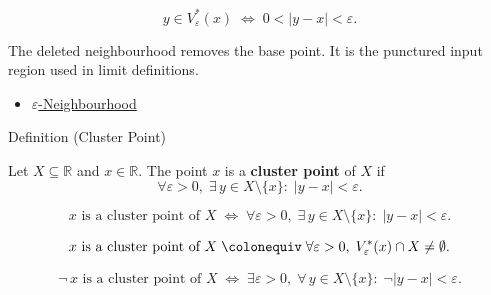 \begin{remark*}
\[
  y\in V_\varepsilon^*(x)\;\Longleftrightarrow\;0<|y-x|<\varepsilon.
\]
\end{remark*}

\begin{remark*}[Interpretation]
The deleted neighbourhood removes the base point. It is the punctured
input region used in limit definitions.
\end{remark*}

\begin{dependencies}
\begin{itemize}
  \item \hyperref[def:epsilon-neighbourhood]{$\varepsilon$-Neighbourhood}
\end{itemize}
\end{dependencies}


\begin{definitionbox}{Definition (Cluster Point)}
\begin{definition}
\label{def:cluster-point-r}
Let $X \subseteq \mathbb{R}$ and $x \in \mathbb{R}$. The point $x$
is a \textbf{cluster point} of $X$ if
\[
  \forall\varepsilon > 0,\;
  \exists\, y \in X \setminus \{x\} :\;
  |y-x|<\varepsilon.
\]
\end{definition}
\end{definitionbox}

\begin{remark*}
\[
  x\text{ is a cluster point of }X
  \;\iff\;
  \forall\varepsilon > 0,\;
  \exists\, y \in X \setminus \{x\} :\;
  |y - x| < \varepsilon.
\]
\end{remark*}

\begin{remark*}
\[
  x\text{ is a cluster point of }X
  \;\colonequiv\;
  \forall\varepsilon > 0,\;
  V_\varepsilon^*(x) \cap X \neq \emptyset.
\]
\end{remark*}

\begin{remark*}
\[
  \neg\,x\text{ is a cluster point of }X
  \;\iff\;
  \exists\varepsilon > 0,\;
  \forall\, y \in X \setminus \{x\} :\;
  \neg|y-x|<\varepsilon.
\]
\end{remark*}

